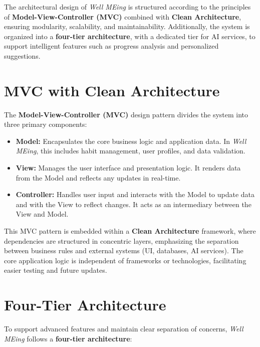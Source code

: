 The architectural design of \textit{Well MEing} is structured according to the principles of \textbf{Model-View-Controller (MVC)} combined with \textbf{Clean Architecture}, ensuring modularity, scalability, and maintainability. Additionally, the system is organized into a \textbf{four-tier architecture}, with a dedicated tier for AI services, to support intelligent features such as progress analysis and personalized suggestions.

\section{MVC with Clean Architecture}

The \textbf{Model-View-Controller (MVC)} design pattern divides the system into three primary components:

\begin{itemize}
    \item \textbf{Model:} Encapsulates the core business logic and application data. In \textit{Well MEing}, this includes habit management, user profiles, and data validation.
    \item \textbf{View:} Manages the user interface and presentation logic. It renders data from the Model and reflects any updates in real-time.
    \item \textbf{Controller:} Handles user input and interacts with the Model to update data and with the View to reflect changes. It acts as an intermediary between the View and Model.
\end{itemize}

This MVC pattern is embedded within a \textbf{Clean Architecture} framework, where dependencies are structured in concentric layers, emphasizing the separation between business rules and external systems (UI, databases, AI services). The core application logic is independent of frameworks or technologies, facilitating easier testing and future updates.

\section{Four-Tier Architecture}

To support advanced features and maintain clear separation of concerns, \textit{Well MEing} follows a \textbf{four-tier architecture}:

